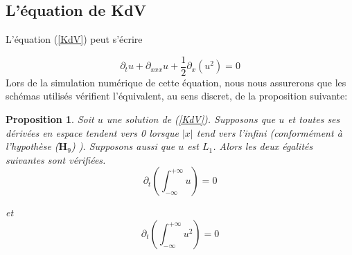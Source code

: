 \documentclass[12pt,a4paper]{article}
\newtheorem{prop}[dfn]{\textbf{Proposition}}
\numberwithin{equation}{section}
\begin{document}
\subsection{L'équation de KdV}
L'équation (\ref{KdV}) peut s'écrire

\begin{equation*}
    \partial_tu + \partial_{xxx}u +\frac{1}{2}\partial_x(u^2)  = 0
\end{equation*}
Lors de la simulation numérique de cette équation, nous nous assurerons que les schémas utilisés vérifient l'équivalent, au sens discret, de la proposition suivante:

\begin{prop}
    Soit $u$ une solution de (\ref{KdV}). Supposons que $u$ et toutes ses dérivées en espace tendent vers 0 lorsque $|x|$ tend vers l'infini (conformément à l'hypothèse ($\textbf{H}_9$) ). Supposons aussi que $u$ est $L_1$. Alors les deux égalités suivantes sont vérifiées.
    \begin{equation*}
        \partial_t\left(\int_{-\infty}^{+\infty}u\right) = 0
    \end{equation*}
    
    et 
    \begin{equation*}
        \partial_t\left(\int_{-\infty}^{+\infty}u^2\right) = 0
    \end{equation*}
\end{prop}
\end{document}
